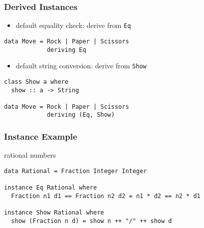 \documentclass[dvipsnames]{beamer}
\theoremstyle{plain}
\begin{document}
\begin{frame}[fragile]
  \frametitle{Derived Instances}

  \begin{itemize}
    \item default equality check: derive from \lstinline|Eq|
  \end{itemize}

  \begin{exampleblock}{}
    \begin{lstlisting}
data Move = Rock | Paper | Scissors
            deriving Eq
    \end{lstlisting}
  \end{exampleblock}

  \pause
  \begin{itemize}
    \item default string conversion: derive from \lstinline|Show|
  \end{itemize}

  \begin{exampleblock}{}
    \begin{lstlisting}
class Show a where
  show :: a -> String

data Move = Rock | Paper | Scissors
            deriving (Eq, Show)
   \end{lstlisting}
  \end{exampleblock}
\end{frame}

\begin{frame}[fragile]
  \frametitle{Instance Example}

  \begin{exampleblock}{rational numbers}
    \begin{lstlisting}
data Rational = Fraction Integer Integer

instance Eq Rational where
  Fraction n1 d1 == Fraction n2 d2 = n1 * d2 == n2 * d1

instance Show Rational where
  show (Fraction n d) = show n ++ "/" ++ show d
    \end{lstlisting}
  \end{exampleblock}
\end{frame}
\end{document}
